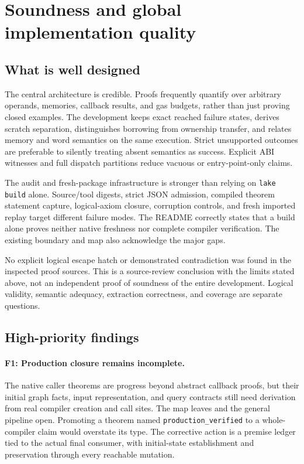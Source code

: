 \documentclass[conference]{IEEEtran}
\newcommand{\src}[1]{\path{#1}}
\begin{document}
\section{Soundness and global implementation quality}
\subsection{What is well designed}
The central architecture is credible. Proofs frequently quantify over arbitrary
operands, memories, callback results, and gas budgets, rather than just proving
closed examples. The development keeps exact reached failure states, derives
scratch separation, distinguishes borrowing from ownership transfer, and
relates memory and word semantics on the same execution. Strict unsupported
outcomes are preferable to silently treating absent semantics as success.
Explicit ABI witnesses and full dispatch partitions reduce vacuous or
entry-point-only claims.

The audit and fresh-package infrastructure is stronger than relying on
\texttt{lake build} alone. Source/tool digests, strict JSON admission,
compiled theorem statement capture, logical-axiom closure, corruption controls,
and fresh imported replay target different failure modes. The README correctly
states that a build alone proves neither native freshness nor complete compiler
verification. The existing boundary and map also acknowledge the major gaps.

No explicit logical escape hatch or demonstrated contradiction was found in
the inspected proof sources. This is a source-review conclusion with the
limits stated above, not an independent proof of soundness of the entire
development. Logical validity, semantic adequacy, extraction correctness,
and coverage are separate questions.

\subsection{High-priority findings}
\paragraph{F1: Production closure remains incomplete.}
The native caller theorems are progress beyond abstract callback proofs, but
their initial graph facts, input representation, and query contracts still
need derivation from real compiler creation and call sites. The map leaves
\src{optimizer.recursiveProduction} and the general pipeline open.
Promoting a theorem named \texttt{production\_verified} to a whole-compiler
claim would overstate its type. The corrective action is a premise ledger tied
to the actual final consumer, with initial-state establishment and preservation
through every reachable mutation.
\end{document}

